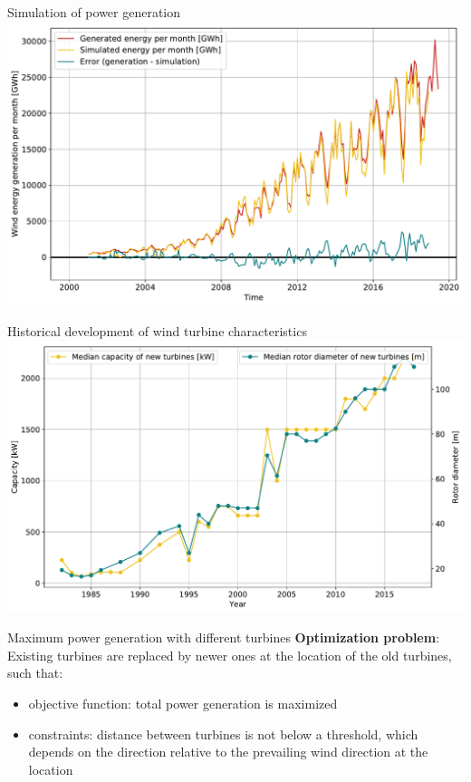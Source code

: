 \documentclass[color=usenames,dvipsnames]{beamer}
\begin{document}
    \begin{frame}{Simulation of power generation}
        \includegraphics[width=\textwidth]{../../figures/simulated-energy_time-series.pdf}
    \end{frame}

    \begin{frame}{Historical development of wind turbine characteristics}
        \includegraphics[width=\textwidth]{../../figures/history_turbines.pdf}
    \end{frame}

    \begin{frame}{Maximum power generation with different turbines}
        \textbf{Optimization problem}:\\
        \bigskip
        Existing turbines are replaced by newer ones at the location of the old
        turbines, such that:\\
        \begin{itemize}
            \item objective function: total power generation is maximized
            \item constraints: distance between turbines is not below a threshold\pause ,
                which depends on the direction relative to the prevailing wind direction
                at the location
        \end{itemize}
    \end{frame}
\end{document}
